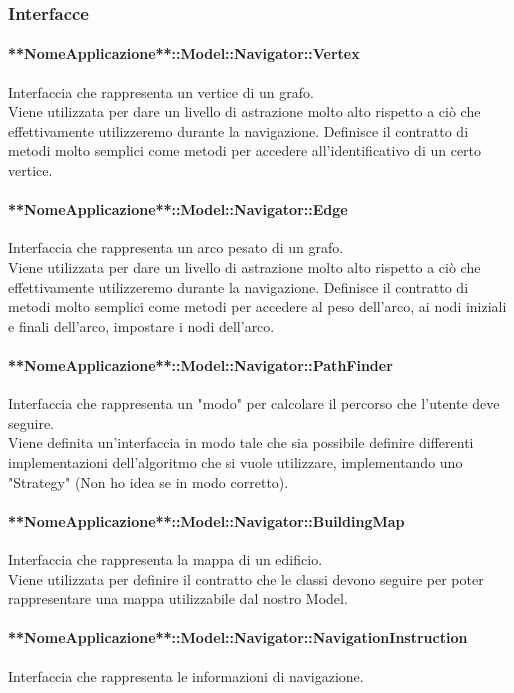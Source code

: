 \documentclass[../SpecificaTecnica.tex]{subfiles}
\begin{document}
			\subsubsection{Interfacce}
				\paragraph{**NomeApplicazione**::Model::Navigator::Vertex}
					Interfaccia che rappresenta un vertice di un grafo. \\ 
					Viene utilizzata per dare un livello di astrazione molto alto rispetto a ciò che effettivamente utilizzeremo durante la navigazione. Definisce il contratto di metodi molto semplici come metodi per accedere all'identificativo di un certo vertice.
				\paragraph{**NomeApplicazione**::Model::Navigator::Edge}
					Interfaccia che rappresenta un arco pesato di un grafo. \\ 
					Viene utilizzata per dare un livello di astrazione molto alto rispetto a ciò che effettivamente utilizzeremo durante la navigazione. Definisce il contratto di metodi molto semplici come metodi per accedere al peso dell'arco, ai nodi iniziali e finali dell'arco, impostare i nodi dell'arco.
				\paragraph{**NomeApplicazione**::Model::Navigator::PathFinder}
					Interfaccia che rappresenta un "modo" per calcolare il percorso che l'utente deve seguire. \\ 
					Viene definita un'interfaccia in modo tale che sia possibile definire differenti implementazioni dell'algoritmo che si vuole utilizzare, implementando uno "Strategy" (Non ho idea se in modo corretto).
				\paragraph{**NomeApplicazione**::Model::Navigator::BuildingMap}
					Interfaccia che rappresenta la mappa di un edificio. \\
					Viene utilizzata per definire il contratto che le classi devono seguire per poter rappresentare una mappa utilizzabile dal nostro Model.
				\paragraph{**NomeApplicazione**::Model::Navigator::NavigationInstruction}
					Interfaccia che rappresenta le informazioni di navigazione. \\
\end{document}
